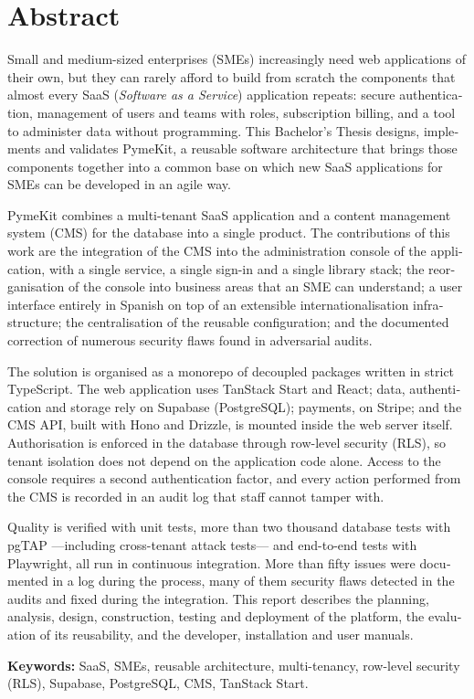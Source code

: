 \chapter*{Abstract}

\begin{otherlanguage}{english}
\noindent Small and medium-sized enterprises (SMEs) increasingly need web
applications of their own, but they can rarely afford to build from scratch
the components that almost every SaaS (\textit{Software as a Service})
application repeats: secure authentication, management of users and teams
with roles, subscription billing, and a tool to administer data without
programming. This Bachelor's Thesis designs, implements and validates
PymeKit, a reusable software architecture that brings those components
together into a common base on which new SaaS applications for SMEs can be
developed in an agile way.

PymeKit combines a multi-tenant SaaS application and a content management
system (CMS) for the database into a single product. The contributions of
this work are the integration of the CMS into the administration console of
the application, with a single service, a single sign-in and a single library
stack; the reorganisation of the console into business areas that an SME can
understand; a user interface entirely in Spanish on top of an extensible
internationalisation infrastructure; the centralisation of the reusable
configuration; and the documented correction of numerous security flaws
found in adversarial audits.

The solution is organised as a monorepo of decoupled packages written in
strict TypeScript. The web application uses TanStack Start and React; data,
authentication and storage rely on Supabase (PostgreSQL); payments, on
Stripe; and the CMS API, built with Hono and Drizzle, is mounted inside the
web server itself. Authorisation is enforced in the database through
row-level security (RLS), so tenant isolation does not depend on the
application code alone. Access to the console requires a second
authentication factor, and every action performed from the CMS is recorded in
an audit log that staff cannot tamper with.

Quality is verified with unit tests, more than two thousand database tests
with pgTAP ---including cross-tenant attack tests--- and end-to-end tests with
Playwright, all run in continuous integration. More than fifty issues were
documented in a log during the process, many of them security flaws detected
in the audits and fixed during the integration. This report describes the
planning, analysis, design, construction, testing and deployment of the
platform, the evaluation of its reusability, and the developer, installation
and user manuals.

\vspace{.5cm}

\noindent \textbf{Keywords:} SaaS, SMEs, reusable architecture,
multi-tenancy, row-level security (RLS), Supabase, PostgreSQL, CMS, TanStack
Start.
\end{otherlanguage}
